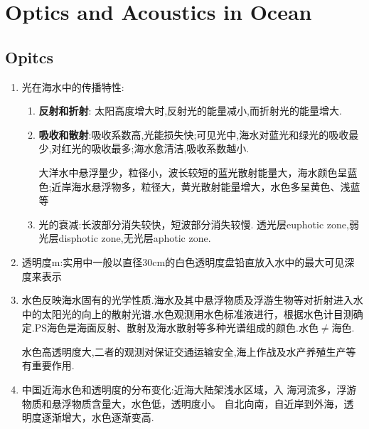 \section{Optics and Acoustics in Ocean}
	\subsection{Opitcs}
		\begin{enumerate}
			\item 光在海水中的传播特性:
				\begin{enumerate}
					\item \textbf{反射和折射}: 太阳高度增大时,反射光的能量减小,而折射光的能量增大.
					\item \textbf{吸收和散射}:吸收系数高,光能损失快;可见光中,海水对蓝光和绿光的吸收最少,对红光的吸收最多;海水愈清洁,吸收系数越小.
									 
					
					大洋水中悬浮量少，粒径小，波长较短的蓝光散射能量大，海水颜色呈蓝色;近岸海水悬浮物多，粒径大，黄光散射能量增大，水色多呈黄色、浅蓝等
					\item 光的衰减:长波部分消失较快，短波部分消失较慢.
					透光层euphotic zone,弱光层disphotic zone,无光层aphotic zone.
				\end{enumerate}
			\item 透明度m:实用中一般以直径30cm的白色透明度盘铅直放入水中的最大可见深度来表示
			\item 水色反映海水固有的光学性质.海水及其中悬浮物质及浮游生物等对折射进入水中的太阳光的向上的散射光谱,水色观测用水色标准液进行，根据水色计目测确定.PS海色是海面反射、散射及海水散射等多种光谱组成的颜色.水色$\neq$海色.
			
			水色高透明度大,二者的观测对保证交通运输安全,海上作战及水产养殖生产等有重要作用.
			
			\item 中国近海水色和透明度的分布变化:近海大陆架浅水区域，入 海河流多，浮游物质和悬浮物质含量大，水色低，透明度小。
			自北向南，自近岸到外海，透明度逐渐增大，水色逐渐变高. 
%				 
		\end{enumerate}
